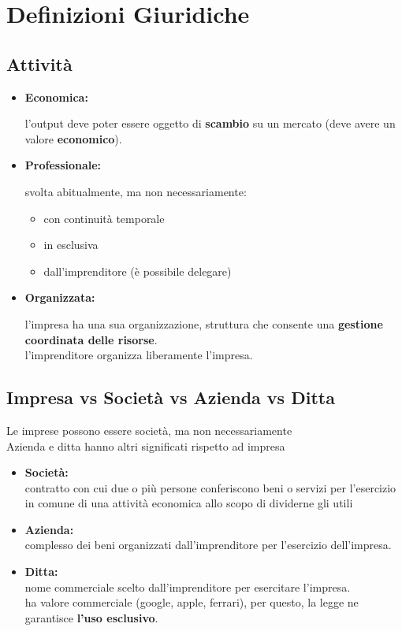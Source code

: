 \documentclass[12pt, letterpaper]{article}
\begin{document}
\section{Definizioni Giuridiche}

	\subsection{Attività}
	
		\begin{itemize}
			\item \textbf{Economica:}
			
				l'output deve poter essere oggetto di \textbf{scambio} su un mercato (deve avere un valore \textbf{economico}).
			
			\item \textbf{Professionale:}
			
				svolta abitualmente, ma non necessariamente:
				\begin{itemize}
					\item con continuità temporale
					\item in esclusiva
					\item dall'imprenditore (è possibile delegare)
				\end{itemize}
			
			\item \textbf{Organizzata:}
			
				l'impresa ha una sua organizzazione, struttura che consente una \textbf{gestione coordinata delle risorse}.\\		
				l'imprenditore organizza liberamente l'impresa.
			
		\end{itemize}	
	
	\subsection{Impresa vs Società vs Azienda vs Ditta}
		
		Le imprese possono essere società, ma non necessariamente\\		
		Azienda e ditta hanno altri significati rispetto ad impresa
		
		\begin{itemize}
			\item \textbf{Società:}\\			
				contratto con cui due o più persone conferiscono beni o servizi per l'esercizio in comune di una attività economica allo scopo di dividerne gli utili
			
			\item \textbf{Azienda:}\\			
				complesso dei beni organizzati dall'imprenditore per l'esercizio dell'impresa.
				
			\item \textbf{Ditta:}\\			
				nome commerciale scelto dall'imprenditore per esercitare l'impresa.\\				
				ha valore commerciale (google, apple, ferrari), per questo, la legge ne garantisce \textbf{l'uso esclusivo}.
				
		\end{itemize}
		
\end{document}
